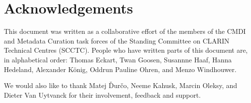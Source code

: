 \section{Acknowledgements}
This document was written as a collaborative effort of the members of the CMDI and Metadata Curation task forces of the Standing Committee on CLARIN Technical Centres (SCCTC). People who have written parts of this document are, in alphabetical order:
Thomas Eckart,
Twan Goosen,
Susannne Haaf, 
Hanna Hedeland,
Alexander König,
Oddrun Pauline Ohren, 
and Menzo Windhouwer.

We would also like to thank 
Matej Ďurčo,
Neeme Kahusk,
Marcin Oleksy,
and Dieter Van Uytvanck
for their involvement, feedback and support.